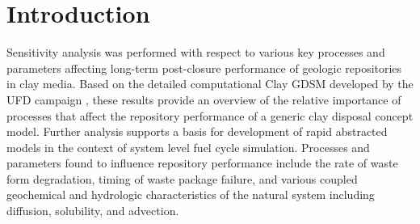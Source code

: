 
\section{Introduction}

Sensitivity analysis was performed with respect to various key processes and 
parameters affecting long-term post-closure performance of geologic repositories 
in clay media. Based on the detailed computational Clay 
\gls{GDSM} developed by the \gls{UFD} campaign \cite{clayton_generic_2011}, 
these results provide an overview of the relative importance of processes 
that affect the repository performance of a generic clay disposal concept model. 
Further analysis supports a basis for development of rapid abstracted models in 
the context of system level fuel cycle simulation. Processes and parameters 
found to influence repository performance include the rate of waste form 
degradation, timing of waste package failure, and various coupled geochemical 
and hydrologic characteristics of the natural system including diffusion, 
solubility, and advection.
